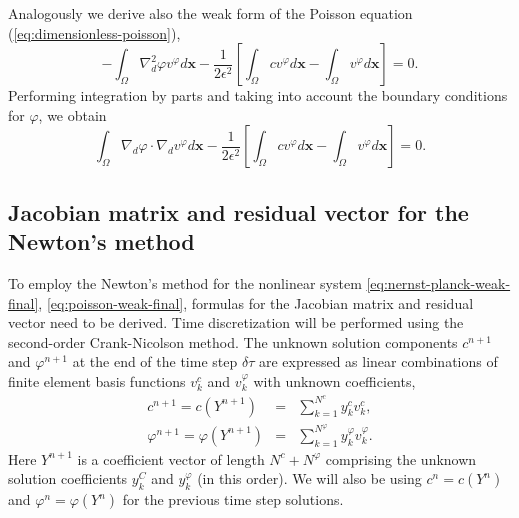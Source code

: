 Analogously we derive also the weak form of the Poisson equation (\ref{eq:dimensionless-poisson}),
\begin{equation}
  -\int_{\Omega}\nabla_d^2\varphi v^\varphi d\mathbf{x}-
  \frac{1}{2\epsilon^2}\left[\int_{\Omega}cv^\varphi d\mathbf{x}-
  \int_{\Omega}v^\varphi d\mathbf{x}\right]=0.
  \label{eq:poisson-weak1}
\end{equation}
Performing integration by parts and taking into account the boundary 
conditions for $\varphi$, we obtain
\begin{equation}
  \int_{\Omega}\nabla_d\varphi\cdot\nabla_d v^\varphi d\mathbf{x}-
  \frac{1}{2\epsilon^2}\left[\int_{\Omega}cv^\varphi d\mathbf{x}-
  \int_{\Omega}v^\varphi d\mathbf{x}\right]=0.
  \label{eq:poisson-weak-final}
\end{equation}


\subsection{Jacobian matrix and residual vector for the Newton's method}
To employ the Newton's method for the nonlinear system \eqref{eq:nernst-planck-weak-final},
\eqref{eq:poisson-weak-final}, formulas for the Jacobian matrix and residual vector need to
be derived. Time discretization will be performed using the second-order Crank-Nicolson 
method. The unknown solution components 
$c^{n+1}$ and $\varphi^{n+1}$ at the end of the time step $\delta\tau$ are expressed 
as linear combinations of finite element basis functions $v_k^{c}$ 
and $v_k^{\varphi}$ with unknown coefficients,
\begin{eqnarray}
  c^{n+1} = c(Y^{n+1}) &=& \sum_{k=1}^{N^c} y_k^{c} v_k^{c}, \label{eq:cnotation}\\
  \varphi^{n+1} = \varphi(Y^{n+1}) &=& \sum_{k=1}^{N^{\varphi}} y_k^{\varphi} v_k^{\varphi}\label{eq:phinotation}.
\end{eqnarray}
Here $Y^{n+1}$ is a coefficient vector of length $N^c + N^{\varphi}$ comprising the unknown 
solution coefficients $y_k^{C}$ and $y_k^{\varphi}$ (in this order). We will also be 
using $c^n = c(Y^n)$ and $\varphi^n = \varphi(Y^n)$ for the previous time step solutions.

